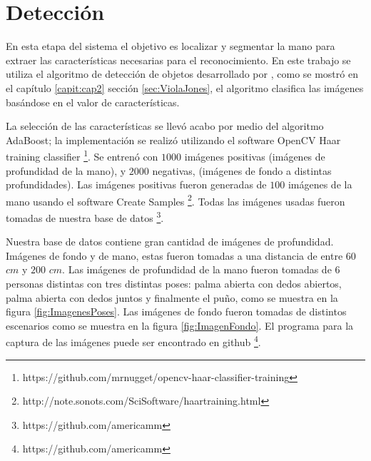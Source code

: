 
\section{Detección}\label{sec:DeteccionSystem} 

En esta etapa del sistema el objetivo es localizar y segmentar la mano para extraer las características necesarias para el reconocimiento. 
En este trabajo se utiliza el algoritmo de detección de objetos desarrollado por \citep{Viola2001}, como se mostró en el cap\'itulo \ref{capit:cap2} sección \ref{sec:ViolaJones}, el algoritmo  clasifica las imágenes basándose en el valor de características. 


La selección de las características se llev\'o acabo por medio del algoritmo AdaBoost; la implementaci\'on se realiz\'o utilizando el software OpenCV Haar training classifier \footnote{https://github.com/mrnugget/opencv-haar-classifier-training}. Se entren\'o con $1000$ imágenes positivas (imágenes de profundidad de la mano), y $2000$ negativas, (imágenes de fondo a distintas profundidades). Las imágenes positivas fueron generadas de $100$ imágenes de la mano usando el software Create Samples \footnote{http://note.sonots.com/SciSoftware/haartraining.html}. Todas las imágenes usadas fueron tomadas de nuestra base de  datos \footnote{https://github.com/americamm}.

Nuestra base de datos contiene gran cantidad de imágenes de profundidad. Imágenes de fondo y de mano, estas fueron tomadas a una distancia de entre $60$ $cm$ y $200$ $cm$. Las imágenes de profundidad de la mano fueron tomadas de $6$ personas distintas con tres distintas poses: palma abierta con dedos abiertos, palma abierta con dedos juntos y finalmente el pu\~no, como se muestra en la figura \ref{fig:ImagenesPoses}. Las imágenes de fondo fueron tomadas de distintos escenarios como se muestra en la figura \ref{fig:ImagenFondo}. El programa para la captura de las imágenes puede ser encontrado en github \footnote{https://github.com/americamm}.  

